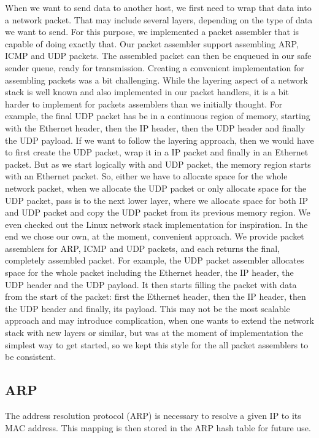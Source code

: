 When we want to send data to another host, we first need to wrap that data into a network packet. That may include several layers, depending on the type of data we want to send. For this purpose, we implemented a packet assembler that is capable of doing exactly that. Our packet assembler support assembling ARP, ICMP and UDP packets. The assembled packet can then be enqueued in our safe sender queue, ready for transmission.
Creating a convenient implementation for assembling packets was a bit challenging. While the layering aspect of a network stack is well known and also implemented in our packet handlers, it is a bit harder to implement for packets assemblers than we initially thought. For example, the final UDP packet has be in a continuous region of memory, starting with the Ethernet header, then the IP header, then the UDP header and finally the UDP payload.
If we want to follow the layering approach, then we would have to first create the UDP packet, wrap it in a IP packet and finally in an Ethernet packet. But as we start logically with and UDP packet, the memory region starts with an Ethernet packet. So, either we have to allocate space for the whole network packet, when we allocate the UDP packet or only allocate space for the UDP packet, pass is to the next lower layer, where we allocate space for both IP and UDP packet and copy the UDP packet from its previous memory region. We even checked out the Linux network stack implementation for inspiration. 
In the end we chose our own, at the moment, convenient approach.
We provide packet assemblers for ARP, ICMP and UDP packets, and each returns the final, completely assembled packet. For example, the UDP packet assembler allocates space for the whole packet including the Ethernet header, the IP header, the UDP header and the UDP payload. It then starts filling the packet with data from the start of the packet: first the Ethernet header, then the IP header, then the UDP header and finally, its payload. This may not be the most scalable approach and may introduce complication, when one wants to extend the network stack with new layers or similar, but was at the moment of implementation the simplest way to get started, so we kept this style for the all packet assemblers to be consistent.

\subsection{ARP}

The address resolution protocol (ARP) is necessary to resolve a given IP to its MAC address. This mapping is then stored in the ARP hash table for future use.

